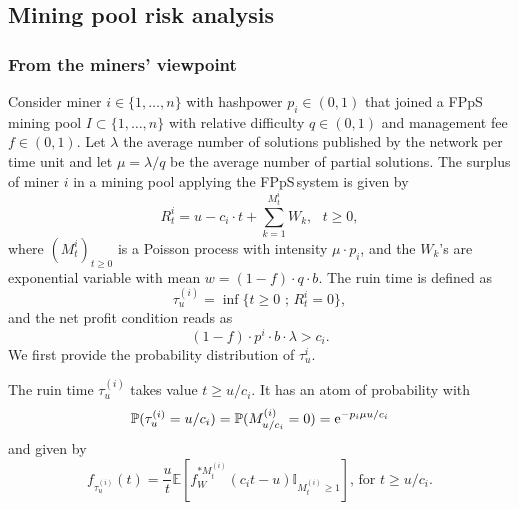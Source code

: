 \subsection{Mining pool risk analysis}\label{ssec:mining_pool_risk_analysis}


\subsubsection{From the miners' viewpoint}\label{sssec:miner_viewpoint}
Consider miner $i\in \{1,\ldots, n\}$ with hashpower $p_i\in(0,1)$ that joined a FPpS mining pool $I\subset\{1,\ldots, n\}$ with relative difficulty $q\in(0,1)$ and management fee $f\in(0,1)$. Let $\lambda$ the average number of solutions published by the network per time unit and let $\mu = \lambda/q$ be the average number of partial solutions. The surplus of miner $i$ in a mining pool applying the FPpS\,system is given by
\begin{equation*}
R_t^i = u - c_i\cdot t + \sum_{k = 1}^{M^i_t}W_k,\text{ }t\geq0,
\end{equation*}
where $(M^i_t)_{t\geq0}$ is a Poisson process with intensity $\mu \cdot p_i$, and the $W_k$'s are \iid exponential variable with mean $w = (1-f)\cdot q\cdot b$. The ruin time is defined as 
$$
\tau_u^{(i)} = \inf\{t\geq0\text{ ; } R_t^i = 0\},
$$
and the net profit condition reads as 
$$
(1-f)\cdot p^{i}\cdot b\cdot \lambda>c_i.
$$
We first provide the probability distribution of $\tau_u^{i}$.
\begin{theo}\label{theo:pdf_ruin_time_miner_in_pool}
The ruin time $\tau_u^{(i)}$ takes value $t\geq u/c_i$. It has an atom of probability with 
\[
\mathbb{P}(\tau_u^{(i)} = u/c_i) = \mathbb{P}(M^{(i)}_{u/c_i}=0)=\mathrm{e}^{-p_i\mu u/c_i}
\]
and \pdf given by 
\begin{equation}\label{eq:pdf_ruin_time_miner_in_pool}
f_{\tau_u^{(i)}}(t)=\frac{u}{t}\mathbb{E}\left[f_{W}^{\ast M_t^{(i)}}(c_i t-u)\mathbb{I}_{M^{(i)}_t \geq1}\right]\text{, for }t\geq u/c_i.
\end{equation}
\end{theo}
